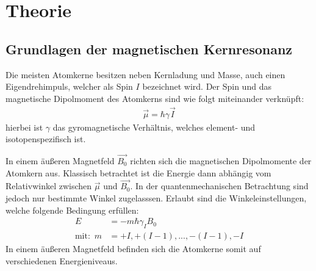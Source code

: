 \section{Theorie}
\label{sec:Theorie}
\subsection{Grundlagen der magnetischen Kernresonanz}
\label{sec:grundlagen}
Die meisten Atomkerne besitzen neben Kernladung und Masse, auch einen Eigendrehimpuls, welcher als Spin $I$ bezeichnet wird.
Der Spin und das magnetische Dipolmoment des Atomkerns sind wie folgt miteinander verkn\"{u}pft:
\begin{align*}
	\overrightarrow{\mu} = \hbar \gamma \overrightarrow{I}
\end{align*}
hierbei ist $\gamma$ das gyromagnetische Verh\"{a}ltnis, welches element- und isotopenspezifisch ist.

In einem \"{a}u{\ss}eren Magnetfeld $\overrightarrow{B_0}$ richten sich die magnetischen Dipolmomente der Atomkern aus.
Klassisch betrachtet ist die Energie dann abh\"{a}ngig vom Relativwinkel zwischen $\overrightarrow{\mu}$ und $\overrightarrow{B_0}$.
In der quantenmechanischen Betrachtung sind jedoch nur bestimmte Winkel zugelasssen.
Erlaubt sind die Winkeleinstellungen, welche folgende Bedingung erf\"{u}llen:
\begin{align}
	E &= -m \hbar \gamma_I B_0  \\
	\text{mit:} \, \, \,  m &= +I, +(I-1), ..., -(I-1), -I \nonumber
\end{align}
In einem \"{a}u{\ss}eren Magnetfeld befinden sich die Atomkerne somit auf verschiedenen Energieniveaus.

